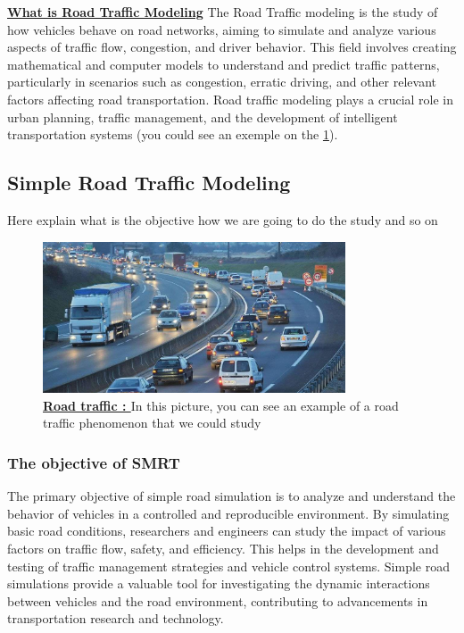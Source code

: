 \documentclass{article}
\begin{document}
		\textbf{\underline{What is Road Traffic Modeling}} \newline\newline
		The Road Traffic modeling  is the study of how vehicles behave on road networks, aiming to simulate and analyze various aspects of traffic flow, congestion, and driver behavior. This field involves creating mathematical and computer models to understand and predict traffic patterns, particularly in scenarios such as congestion, erratic driving, and other relevant factors affecting road transportation. Road traffic modeling plays a crucial role in urban planning, traffic management, and the development of intelligent transportation systems (you could see an exemple on the \ref{fig:intro}).
	
	\subsection{Simple Road Traffic Modeling}
	
		Here explain what is the objective how we are going to do the study and so on \cite{JEIHANI2017164}
		
		\begin{figure}[H]
			\centering
			\includegraphics[width=0.8\textwidth]{intro.jpg}
			\caption{\textbf{\underline{Road traffic : }} In this picture, you can see an example of a road traffic phenomenon that we could study}
			\label{fig:intro}
		\end{figure}
	
		
		\subsubsection{The objective of SMRT}
		The primary objective of simple road simulation is to analyze and understand the behavior of vehicles in a controlled and reproducible environment. By simulating basic road conditions, researchers and engineers can study the impact of various factors on traffic flow, safety, and efficiency. This helps in the development and testing of traffic management strategies and vehicle control systems. Simple road simulations provide a valuable tool for investigating the dynamic interactions between vehicles and the road environment, contributing to advancements in transportation research and technology.
		
\end{document}
